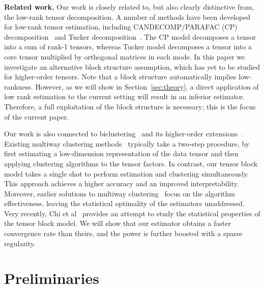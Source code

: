\documentclass[11pt]{article}
\theoremstyle{plain}
\theoremstyle{definition}
\begin{document}
{\bf Related work.} Our work is closely related to, but also clearly distinctive from, the low-rank tensor decomposition. A number of methods have been developed for low-rank tensor estimation, including CANDECOMP/PARAFAC (CP) decomposition~\cite{hitchcock1927expression} and Tucker decomposition~\cite{tucker1966some}. The CP model decomposes a tensor into a sum of rank-1 tensors, whereas Tucker model decomposes a tensor into a core tensor multiplied by orthogonal matrices in each mode. In this paper we investigate an alternative block structure assumption, which has yet to be studied for higher-order tensors. Note that a block structure automatically implies low-rankness. However, as we will show in Section~\ref{sec:theory}, a direct application of low rank estimation to the current setting will result in an inferior estimator. Therefore, a full exploitation of the block structure is necessary; this is the focus of the current paper. 

Our work is also connected to biclustering~\cite{tan2014sparse} and its higher-order extensions~\cite{kolda2008scalable,wang2015multi}. Existing multiway clustering methods~\cite{kolda2008scalable,wang2015multi,hore2016tensor,wang2018learning} typically take a two-step procedure, by first estimating a low-dimension representation of the data tensor and then applying clustering algorithms to the tensor factors. In contrast, our tensor block model takes a single shot to perform estimation and clustering simultaneously. This approach achieves a higher accuracy and an improved interpretability. Moreover, earlier solutions to multiway clustering~\cite{jegelka2009approximation,kolda2008scalable} focus on the algorithm effectiveness, leaving the statistical optimality of the estimators unaddressed. Very recently, Chi et al~\cite{chi2018provable} provides an attempt to study the statistical properties of the tensor block model. We will show that our estimator obtains a faster convergence rate than theirs, and the power is further boosted with a sparse regularity. 



\section{Preliminaries}
\end{document}
